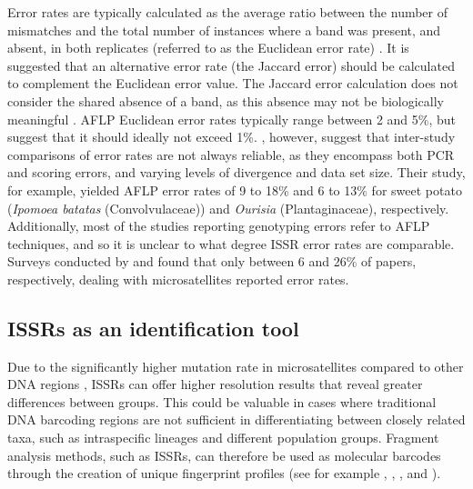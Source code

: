 \noindent Error rates are typically calculated as the average ratio between the number of mismatches and the total number of instances where a band was present, and absent, in both replicates (referred to as the Euclidean error rate) \citep{pompanon2005genotyping, bonin2007statistical}. It is suggested that an alternative error rate (the Jaccard error) should be calculated to complement the Euclidean error value. The Jaccard error calculation does not consider the shared absence of a band, as this absence may not be biologically meaningful \citep{holland2008optimizing}. AFLP Euclidean error rates typically range between 2 and 5\%, but \citet{bonin2007statistical} suggest that it should ideally not exceed 1\%. \citet{holland2008optimizing}, however, suggest that inter-study comparisons of error rates are not always reliable, as they encompass both PCR and scoring errors, and varying levels of divergence and data set size. Their study, for example, yielded AFLP error rates of 9 to 18\% and 6 to 13\% for sweet potato (\textit{Ipomoea batatas} (Convolvulaceae)) and \textit{Ourisia} (Plantaginaceae), respectively. Additionally, most of the studies reporting genotyping errors refer to AFLP techniques, and so it is unclear to what degree ISSR error rates are comparable. Surveys conducted by \citet{guichoux2011current} and \citet{bonin2004track} found that only between 6 and 26\% of papers, respectively, dealing with microsatellites reported error rates.  

\subsection{ISSRs as an identification tool}
Due to the significantly higher mutation rate in microsatellites compared to other DNA regions \citep{Zietkiewicz1994, Reddy2002}, ISSRs can offer higher resolution results that reveal greater differences between groups. This could be valuable in cases where traditional DNA barcoding regions are not sufficient in differentiating between closely related taxa, such as intraspecific lineages and different population groups. Fragment analysis methods, such as ISSRs, can therefore be used as molecular barcodes through the creation of unique fingerprint profiles (see for example \citet{galbacs2009identification}, \citet{adhikari2015efficiency}, \citet{li2018establishment}, and \citet{zhao2019molecular}).

\vspace{0.5cm}

